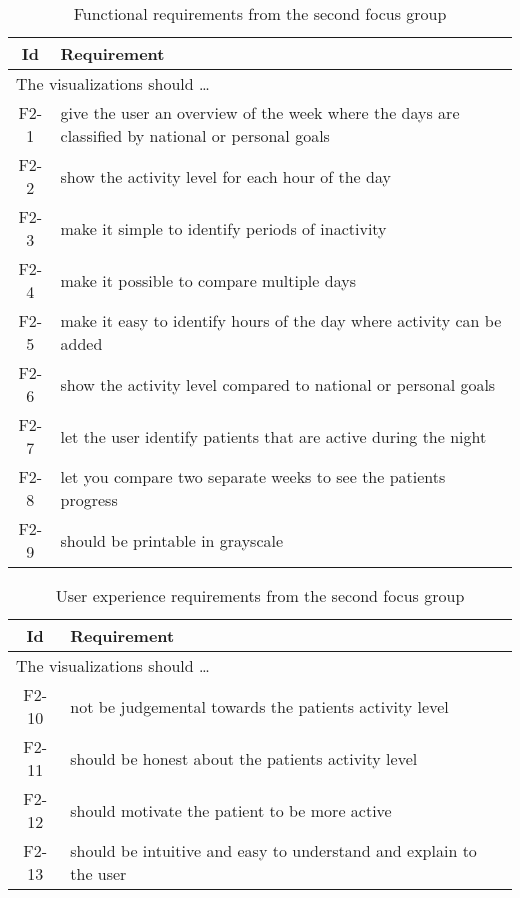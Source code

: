 \begin{table}[h!]
  \begin{center}
  \begin{tabular}{|c|p{12cm}|}
    \hline
      \textbf{Id} & \textbf{Requirement} \\ \hline
    \multicolumn{2}{|l|}{The visualizations should \ldots} \\ \hline
      F2-1 & give the user an overview of the week where the days are classified by national or personal goals \\ \hline
      F2-2 & show the activity level for each hour of the day \\ \hline
      F2-3 & make it simple to identify periods of inactivity \\ \hline
      F2-4 & make it possible to compare multiple days \\ \hline
      F2-5 & make it easy to identify hours of the day where activity can be added \\ \hline
      F2-6 & show the activity level compared to national or personal goals \\ \hline
      F2-7 & let the user identify patients that are active during the night \\ \hline
      F2-8 & let you compare two separate weeks to see the patients progress \\ \hline
      F2-9 & should be printable in grayscale \\ \hline
  \end{tabular}
  \end{center}
  \caption{Functional requirements from the second focus group}
\end{table}

\begin{table}[h!]
  \begin{center}
  \begin{tabular}{|c|p{12cm}|}
    \hline
      \textbf{Id} & \textbf{Requirement} \\ \hline
    \multicolumn{2}{|l|}{The visualizations should \ldots} \\ \hline
      F2-10 & not be judgemental towards the patients activity level \\ \hline
      F2-11 & should be honest about the patients activity level \\ \hline
      F2-12 & should motivate the patient to be more active \\ \hline
      F2-13 & should be intuitive and easy to understand and explain to the user \\ \hline
  \end{tabular}
  \end{center}
  \caption{User experience requirements from the second focus group}
\end{table}



